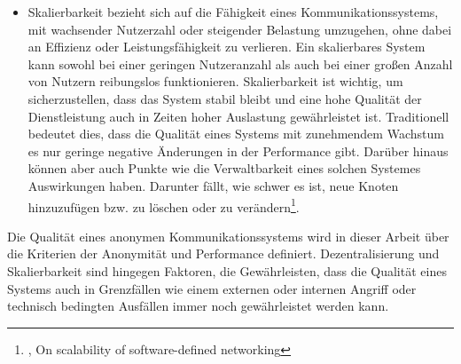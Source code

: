 \begin{itemize}
\item Skalierbarkeit bezieht sich auf die Fähigkeit eines Kommunikationssystems, mit wachsender Nutzerzahl oder steigender Belastung umzugehen, ohne dabei an Effizienz oder Leistungsfähigkeit zu verlieren. Ein skalierbares System kann sowohl bei einer geringen Nutzeranzahl als auch bei einer großen Anzahl von Nutzern reibungslos funktionieren. Skalierbarkeit ist wichtig, um sicherzustellen, dass das System stabil bleibt und eine hohe Qualität der Dienstleistung auch in Zeiten hoher Auslastung gewährleistet ist. Traditionell bedeutet dies, dass die Qualität eines Systems mit zunehmendem Wachstum es nur geringe negative Änderungen in der Performance gibt. Darüber hinaus können aber auch Punkte wie die Verwaltbarkeit eines solchen Systemes Auswirkungen haben. Darunter fällt, wie schwer es ist, neue Knoten hinzuzufügen bzw. zu löschen oder zu verändern\footnote{\cite{ScalabilityOfNetworking}, On scalability of software-defined networking}.

\end{itemize}

Die Qualität eines anonymen Kommunikationssystems wird in dieser Arbeit über die Kriterien der Anonymität und Performance definiert. Dezentralisierung und Skalierbarkeit sind hingegen Faktoren, die Gewährleisten, dass die Qualität eines Systems auch in Grenzfällen wie einem externen oder internen Angriff oder technisch bedingten Ausfällen immer noch gewährleistet werden kann.